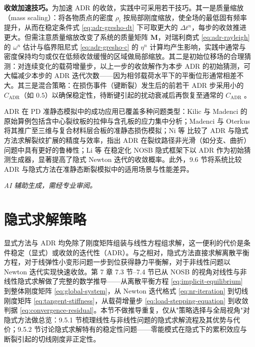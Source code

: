 \textbf{收敛加速技巧。}为加速 ADR 的收敛，实践中可采用若干技巧。其一是质量缩放（mass scaling）：将各物质点的密度 $\rho_i$ 按局部刚度缩放，使全场的最低固有频率提升，从而在稳定条件式 \eqref{eq:adr-gresho-dt} 下可取更大的 $\Delta t^{n}$，每步的收敛推进更大。但需注意质量缩放改变了系统的质量矩阵 $\mathbf{M}$，对瑞利商式 \eqref{eq:adr-rayleigh} 的 $\omega^{n}$ 估计与临界阻尼式 \eqref{eq:adr-gresho-c} 的 $\eta^{n}$ 计算均产生影响，实践中通常与密度保持均匀或仅在低频收敛缓慢的区域做局部缩放。其二是初始位移场的合理猜测：对连续变化的载荷增量步，以上一步的收敛解作为本步 ADR 的初始猜测，可大幅减少本步的 ADR 迭代次数——因为相邻载荷水平下的平衡位形通常相差不大。其三是混合策略：在损伤事件（键断裂）发生后的前若干 ADR 步采用小的 $C_{\text{ADR}}$（如 $0.5$）以确保稳定性，待断键引起的扰动衰减后再恢复至通常的 $C_{\text{ADR}}$ \cite{MadenciOterkus2014}。

ADR 在 PD 准静态模拟中的成功应用已覆盖多种问题类型：Kilic 与 Madenci \cite{KilicMadenci2010} 的原始算例包括含中心裂纹板的拉伸与含孔板的应力集中分析；Madenci 与 Oterkus \cite{MadenciOterkus2014} 将其推广至三维与复合材料层合板的准静态损伤模拟；Ni 等 \cite{Ni2019} 比较了 ADR 与隐式方法求解裂纹扩展的精度与效率，指出 ADR 在裂纹路径非光滑（如分支、曲折）问题中具有更好的鲁棒性；Li 等 \cite{Li2019} 在稳定化 NOSB 隐式框架下以 ADR 作为初始猜测生成器，显著提高了隐式 Newton 迭代的收敛概率。此外，9.6 节将系统比较 ADR 与隐式方法在准静态断裂模拟中的适用场景与性能差异。

\emph{AI 辅助生成，需经专业审阅。}

\section{隐式求解策略}\label{sec:imp-strategies}

显式方法与 ADR 均免除了刚度矩阵组装与线性方程组求解，这一便利的代价是条件稳定（显式）或收敛的迭代性（ADR）。与之相对，隐式方法直接求解离散平衡方程，对于线弹性小变形问题一步到位获得静力平衡解，对于非线性问题以 Newton 迭代实现快速收敛。第 7 章 7.3 节--7.4 节已从 NOSB 的视角对线性与非线性隐式求解做了完整的数学推导——从离散平衡方程 \eqref{eq:implicit-equilibrium} 到整体刚度矩阵 \eqref{eq:global-system}，从 Newton 迭代格式 \eqref{eq:nr-iteration} 到切线刚度矩阵 \eqref{eq:tangent-stiffness}，从载荷增量步 \eqref{eq:load-stepping-equation} 到收敛判据 \eqref{eq:convergence-residual}。本节不做推导重复，仅从"策略选择与全局视角"对隐式方法做总览：9.5.1 节梳理线性与非线性问题的隐式求解流程及其优势与代价；9.5.2 节讨论隐式求解特有的稳定性问题——零能模式在隐式下的累积效应与断裂引起的切线刚度非正定性。

